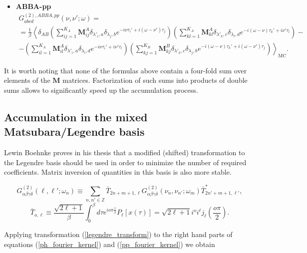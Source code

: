 \documentclass[a4paper,12pt]{article}
\renewcommand{\t}{\ensuremath{\tau}}
\newcommand{\w}{\ensuremath{\omega}}
\begin{document}
\begin{itemize}
	\item \textbf{ABBA-pp}
	\begin{multline}
	G^{(2),ABBA,pp}_{abcd}(\nu,\nu';\w) =\\= \frac{1}{\beta}\left\langle
		\delta_{AB}
		\left(\sum_{ij=1}^{K_A} \mathbf{M}^A_{ij}
			\delta_{\lambda'_i,a} \delta_{\lambda_j,b}
			e^{-i\nu\t_i'+i(\w-\nu')\t_j}
		\right)
		\left(\sum_{kl=1}^{K_A} \mathbf{M}^A_{kl}
			\delta_{\lambda'_k,c} \delta_{\lambda_l,d}
			e^{-i(\w-\nu)\t_k'+i\nu'\t_l}
		\right) -\right.\\\left.-
		\left(\sum_{il=1}^{K_A} \mathbf{M}^A_{il}
			\delta_{\lambda'_i,a} \delta_{\lambda_l,d}
			e^{-i\nu\t_i'+i\nu'\t_l}
		\right)
		\left(\sum_{kj=1}^{K_B} \mathbf{M}^B_{kj}
			\delta_{\lambda'_k,c} \delta_{\lambda_j,b}
			e^{-i(\w-\nu)\t_k'+i(\w-\nu')\t_j}
		\right)
		\right\rangle_\mathrm{MC}.
	\end{multline}
\end{itemize}

It is worth noting that none of the formulas above contain a four-fold sum
over elements of the $\mathbf{M}$ matrices. Factorization of such sums
into products of double sums allows to significantly speed up the accumulation
process.

\subsection{Accumulation in the mixed Matsubara/Legendre basis}

Lewin Boehnke proves in his thesis \cite{Boehnke15} that a modified (shifted)
transformation to the Legendre basis should be used in order to minimize the
number of required coefficients. Matrix inversion of quantities in this basis
is also more stable.

\begin{equation}\label{legendre_transform}
	G^{(2)}_{\alpha\beta\gamma\delta}(\ell,\ell';\w_n) \equiv \sum_{n,n'\in\mathbb{Z}}
	\bar T_{2n+m+1,\ell}
	G^{(2)}_{\alpha\beta\gamma\delta}(\nu_n,\nu_{n'};\w_m)
	\bar T^*_{2n'+m+1,\ell'},
\end{equation}
\begin{equation}
	\bar T_{o,\ell} \equiv \frac{\sqrt{2\ell+1}}{\beta}
	\int_0^\beta d\t e^{io\pi\frac{\t}{\beta}} P_\ell[x(\t)] =
	\sqrt{2\ell+1}i^o i^\ell j_\ell\left(\frac{o\pi}{2}\right).
\end{equation}

Applying transformation (\ref{legendre_transform}) to the right hand parts of
equations (\ref{ph_fourier_kernel}) and (\ref{pp_fourier_kernel}) we obtain
\end{document}
